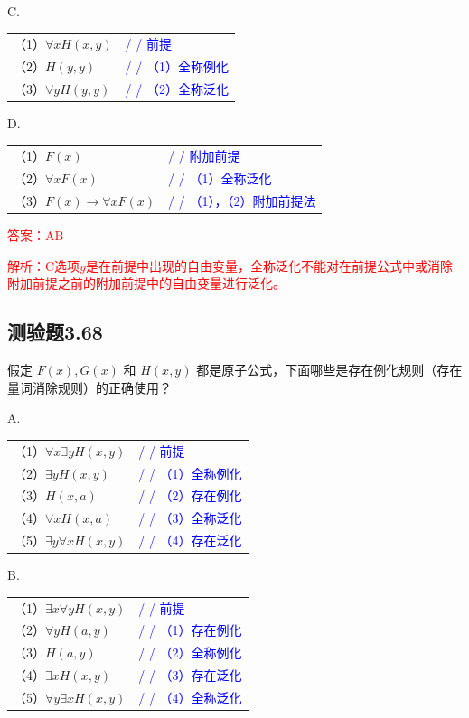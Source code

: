 \documentclass[UTF8, heading=true]{ctexart}
\begin{document}
C. 

\begin{tabular}{ll}
  （1）$\forall x H(x, y)$ & \textcolor{blue}{/ / 前提} \\
  （2）$H(y, y)$ & \textcolor{blue}{/ / （1）全称例化} \\
  （3）$\forall y H(y, y)$ & \textcolor{blue}{/ / （2）全称泛化}
\end{tabular}


D. 

\begin{tabular}{ll}
  （1）$F(x)$ & \textcolor{blue}{/ / 附加前提} \\
  （2）$\forall x F(x)$ & \textcolor{blue}{/ / （1）全称泛化} \\
  （3）$F(x) \rightarrow \forall x F(x)$ & \textcolor{blue}{/ / （1），（2）附加前提法}
\end{tabular}



\textcolor{red}{答案：AB}

\textcolor{red}{解析：C选项$y$是在前提中出现的自由变量，全称泛化不能对在前提公式中或消除附加前提之前的附加前提中的自由变量进行泛化。}

\subsection{测验题3.68}

假定 $F(x), G(x)$ 和 $H(x, y)$ 都是原子公式，下面哪些是存在例化规则（存在量词消除规则）的正确使用？


A. 

\begin{tabular}{ll}
  （1）$\forall x \exists y H(x, y)$ & \textcolor{blue}{/ / 前提} \\
  （2）$\exists y H(x, y)$ & \textcolor{blue}{/ / （1）全称例化} \\
  （3）$H(x, a)$ & \textcolor{blue}{/ / （2）存在例化} \\
  （4）$\forall x H(x, a)$ & \textcolor{blue}{/ / （3）全称泛化} \\
  （5）$\exists y \forall x H(x, y)$ & \textcolor{blue}{/ / （4）存在泛化}
\end{tabular}

B. 

\begin{tabular}{ll}
  （1）$\exists x \forall y H(x, y)$ & \textcolor{blue}{/ / 前提} \\
  （2）$\forall y H(a, y)$ & \textcolor{blue}{/ / （1）存在例化} \\
  （3）$H(a, y)$ & \textcolor{blue}{/ / （2）全称例化} \\
  （4）$\exists x H(x, y)$ & \textcolor{blue}{/ / （3）存在泛化} \\
  （5）$\forall y \exists x H(x, y)$ & \textcolor{blue}{/ / （4）全称泛化}
\end{tabular}
\end{document}
